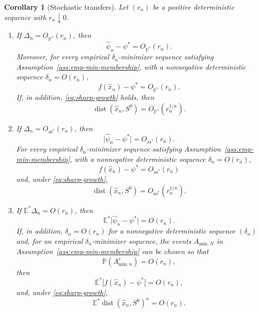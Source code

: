 \documentclass[10pt,a4paper]{amsart}
\newtheorem{corollary}{Corollary}
\begin{document}
\begin{corollary}[Stochastic transfers]\label{cor:generic-mode}
Let $(r_{n})$ be a positive deterministic sequence with $r_{n}\downarrow0$. 
\begin{enumerate}[label=(\roman*),itemsep=0.25em]
\item If $\Delta_{n}=O_{\mathbb{P}^{*}}(r_{n})$, then 
\[
\hat{\psi}_{n}-\psi^{*}=O_{\mathbb{P}^{*}}(r_{n}).
\]
Moreover, for every empirical $\delta_{n}$-minimizer sequence satisfying
Assumption~\ref{ass:emp-min-membership}, with a nonnegative deterministic
sequence $\delta_{n}=O(r_{n})$, 
\[
f(\hat{x}_{n})-\psi^{*}=O_{\mathbb{P}^{*}}(r_{n}).
\]
If, in addition, \eqref{eq:sharp-growth} holds, then 
\[
\operatorname{dist}(\hat{x}_{n},S^{0})=O_{\mathbb{P}^{*}}(r_{n}^{1/\kappa}).
\]
\item If $\Delta_{n}=O_{\mathrm{as}^{*}}(r_{n})$, then
\[
\lvert\hat{\psi}_{n}-\psi^{*}\rvert=O_{\mathrm{as}^{*}}(r_{n}).
\]
For every empirical $\delta_{n}$-minimizer sequence satisfying
Assumption~\ref{ass:emp-min-membership}, with a nonnegative deterministic
sequence $\delta_{n}=O(r_{n})$,
\[
f(\hat{x}_{n})-\psi^{*}=O_{\mathrm{as}^{*}}(r_{n})
\]
and, under \eqref{eq:sharp-growth},
\[
\operatorname{dist}(\hat{x}_{n},S^{0})=O_{\mathrm{as}^{*}}(r_{n}^{1/\kappa}).
\]
\item If $\mathbb{E}^{*}\Delta_{n}=O(r_{n})$, then
\[
\mathbb{E}^{*}\lvert\hat{\psi}_{n}-\psi^{*}\rvert=O(r_{n}).
\]
If, in addition, $\delta_{n}=O(r_{n})$ for a nonnegative deterministic
sequence $(\delta_{n})$ and, for an empirical $\delta_{n}$-minimizer sequence,
the events $A_{\mathrm{min},N}$ in Assumption~\ref{ass:emp-min-membership}
can be chosen so that
\[
\mathbb{P}(A_{\mathrm{min},n}^{c})=O(r_{n}),
\]
then
\[
\mathbb{E}^{*}\bigl[f(\hat{x}_{n})-\psi^{*}\bigr]=O(r_{n}),
\]
and, under \eqref{eq:sharp-growth}, 
\[
\mathbb{E}^{*}\operatorname{dist}(\hat{x}_{n},S^{0})^{\kappa}=O(r_{n}).
\]
\end{enumerate}
\end{corollary}
\end{document}
